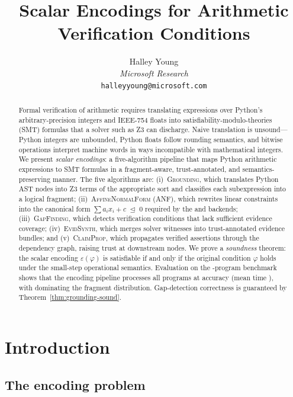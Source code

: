 \documentclass[11pt]{article}
\title{\textbf{Scalar Encodings for Arithmetic Verification Conditions}}
\author{%
  Halley Young\\
  \textit{Microsoft Research}\\
  \texttt{halleyyoung@microsoft.com}
}
\date{}
\newcommand{\Enc}{\varepsilon}               %
\newcommand{\GroundAlg}{\textsc{Grounding}}  %
\newcommand{\GapAlg}{\textsc{GapFinding}}    %
\newcommand{\EvidAlg}{\textsc{EvidSynth}}    %
\newcommand{\PropAlg}{\textsc{ClaimProp}}    %
\begin{document}
\maketitle

\begin{abstract}
Formal verification of \Python{} arithmetic requires translating
expressions over Python's arbitrary-precision integers and
IEEE-754 floats into satisfiability-modulo-theories (SMT) formulas
that a solver such as Z3 can discharge.
Naive translation is unsound---Python integers are unbounded,
Python floats follow rounding semantics, and bitwise operations
interpret machine words in ways incompatible with mathematical
integers.
We present \emph{scalar encodings}: a five-algorithm pipeline that
maps Python arithmetic expressions to SMT formulas in a
fragment-aware, trust-annotated, and semantics-preserving manner.
The five algorithms are:
(i)~\GroundAlg{}, which translates Python AST nodes into Z3 terms
of the appropriate sort and classifies each subexpression into a
logical fragment;
(ii)~\textsc{AffineNormalForm} (ANF), which rewrites linear
constraints into the canonical form $\sum a_i x_i + c \;\mathrel{\trianglelefteq}\; 0$
required by the \QFLIA{} and \QFLRA{} backends;
(iii)~\GapAlg{}, which detects verification conditions that lack
sufficient evidence coverage;
(iv)~\EvidAlg{}, which merges solver witnesses into trust-annotated
evidence bundles; and
(v)~\PropAlg{}, which propagates verified assertions through the
dependency graph, raising trust at downstream nodes.
We prove a \emph{soundness} theorem: the scalar encoding
$\Enc(\varphi)$ is satisfiable if and only if the original
\Python{} condition $\varphi$ holds under the small-step operational
semantics.
Evaluation on the \expTotalPrograms-program \JuGeo{} benchmark shows that the
encoding pipeline processes all programs at \expAccuracy{} accuracy
(mean time \expTimeMean), with \QFLIA{} dominating the fragment distribution.
Gap-detection correctness is guaranteed by Theorem~\ref{thm:grounding-sound}.
\end{abstract}

\newpage

\section{Introduction}\label{sec:intro}

\subsection{The encoding problem}
\end{document}
